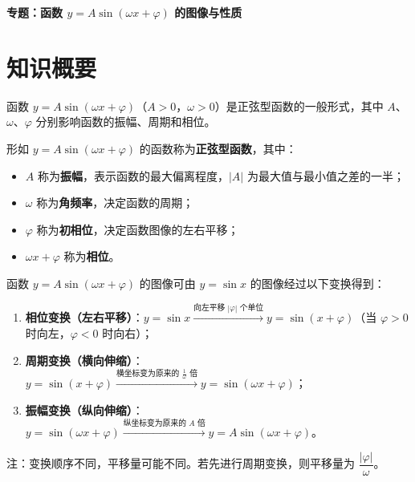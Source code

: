 \documentclass[11pt]{ctexrep}
\begin{document}
\begin{center}
    {\LARGE\bfseries 专题：函数 $y=A\sin(\omega x+\varphi)$ 的图像与性质}
\end{center}

\section*{知识概要}

函数 $y = A\sin(\omega x + \varphi)$（$A > 0$，$\omega > 0$）是正弦型函数的一般形式，其中 $A$、$\omega$、$\varphi$ 分别影响函数的振幅、周期和相位。

\begin{definition}[正弦型函数的定义]
    形如 $y = A\sin(\omega x + \varphi)$ 的函数称为\textbf{正弦型函数}，其中：
    \begin{itemize}
        \item $A$ 称为\textbf{振幅}，表示函数的最大偏离程度，$|A|$ 为最大值与最小值之差的一半；
        \item $\omega$ 称为\textbf{角频率}，决定函数的周期；
        \item $\varphi$ 称为\textbf{初相位}，决定函数图像的左右平移；
        \item $\omega x + \varphi$ 称为\textbf{相位}。
    \end{itemize}
\end{definition}

\begin{property}[正弦型函数的图像变换]
    函数 $y = A\sin(\omega x + \varphi)$ 的图像可由 $y = \sin x$ 的图像经过以下变换得到：
    \begin{enumerate}
        \item \textbf{相位变换（左右平移）}：$y = \sin x \xrightarrow{\text{向左平移 } |\varphi| \text{ 个单位}} y = \sin(x + \varphi)$（当 $\varphi > 0$ 时向左，$\varphi < 0$ 时向右）；
        \item \textbf{周期变换（横向伸缩）}：$y = \sin(x + \varphi) \xrightarrow{\text{横坐标变为原来的 } \frac{1}{\omega} \text{ 倍}} y = \sin(\omega x + \varphi)$；
        \item \textbf{振幅变换（纵向伸缩）}：$y = \sin(\omega x + \varphi) \xrightarrow{\text{纵坐标变为原来的 } A \text{ 倍}} y = A\sin(\omega x + \varphi)$。
    \end{enumerate}
    
    注：变换顺序不同，平移量可能不同。若先进行周期变换，则平移量为 $\dfrac{|\varphi|}{\omega}$。
\end{property}
\end{document}
